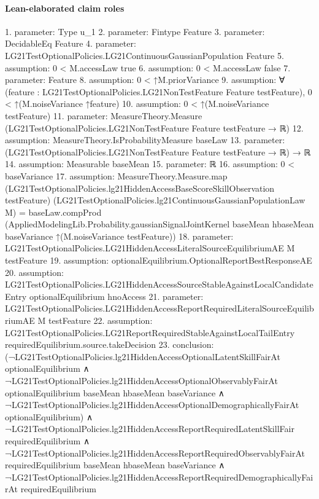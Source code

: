 \documentclass[10pt]{article}
\begin{document}
\paragraph{Lean-elaborated claim roles}\begin{ReviewVerbatim}
1. parameter: Type u_1
2. parameter: Fintype Feature
3. parameter: DecidableEq Feature
4. parameter: LG21TestOptionalPolicies.LG21ContinuousGaussianPopulation Feature
5. assumption: 0 < M.accessLaw {true}
6. assumption: 0 < M.accessLaw {false}
7. parameter: Feature
8. assumption: 0 < ↑M.priorVariance
9. assumption: ∀ (feature : LG21TestOptionalPolicies.LG21NonTestFeature Feature testFeature), 0 < ↑(M.noiseVariance ↑feature)
10. assumption: 0 < ↑(M.noiseVariance testFeature)
11. parameter: MeasureTheory.Measure (LG21TestOptionalPolicies.LG21NonTestFeature Feature testFeature → ℝ)
12. assumption: MeasureTheory.IsProbabilityMeasure baseLaw
13. parameter: (LG21TestOptionalPolicies.LG21NonTestFeature Feature testFeature → ℝ) → ℝ
14. assumption: Measurable baseMean
15. parameter: ℝ
16. assumption: 0 < baseVariance
17. assumption: MeasureTheory.Measure.map (LG21TestOptionalPolicies.lg21HiddenAccessBaseScoreSkillObservation testFeature)
    (LG21TestOptionalPolicies.lg21ContinuousGaussianPopulationLaw M) =
  baseLaw.compProd
    (AppliedModelingLib.Probability.gaussianSignalJointKernel baseMean hbaseMean baseVariance
      ↑(M.noiseVariance testFeature))
18. parameter: LG21TestOptionalPolicies.LG21HiddenAccessLiteralSourceEquilibriumAE M testFeature
19. assumption: optionalEquilibrium.OptionalReportBestResponseAE
20. assumption: LG21TestOptionalPolicies.LG21HiddenAccessSourceStableAgainstLocalCandidateEntry optionalEquilibrium hnoAccess
21. parameter: LG21TestOptionalPolicies.LG21HiddenAccessReportRequiredLiteralSourceEquilibriumAE M testFeature
22. assumption: LG21TestOptionalPolicies.LG21ReportRequiredStableAgainstLocalTailEntry requiredEquilibrium.source.takeDecision
23. conclusion: (¬LG21TestOptionalPolicies.lg21HiddenAccessOptionalLatentSkillFairAt optionalEquilibrium ∧
    ¬LG21TestOptionalPolicies.lg21HiddenAccessOptionalObservablyFairAt optionalEquilibrium baseMean hbaseMean
          baseVariance ∧
      ¬LG21TestOptionalPolicies.lg21HiddenAccessOptionalDemographicallyFairAt optionalEquilibrium) ∧
  ¬LG21TestOptionalPolicies.lg21HiddenAccessReportRequiredLatentSkillFair requiredEquilibrium ∧
    ¬LG21TestOptionalPolicies.lg21HiddenAccessReportRequiredObservablyFairAt requiredEquilibrium baseMean hbaseMean
          baseVariance ∧
      ¬LG21TestOptionalPolicies.lg21HiddenAccessReportRequiredDemographicallyFairAt requiredEquilibrium
\end{ReviewVerbatim}
\end{document}

